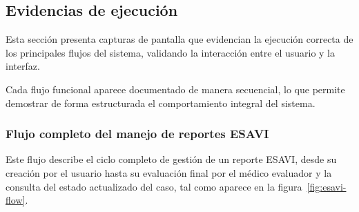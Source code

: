 \subsection{Evidencias de ejecución}

Esta sección presenta capturas de pantalla que evidencian la ejecución correcta de los principales flujos del sistema, validando la interacción entre el usuario y la interfaz.

Cada flujo funcional aparece documentado de manera secuencial, lo que permite demostrar de forma estructurada el comportamiento integral del sistema.

\subsubsection{Flujo completo del manejo de reportes ESAVI}

Este flujo describe el ciclo completo de gestión de un reporte ESAVI, desde su creación por el usuario hasta su evaluación final por el médico evaluador y la consulta del estado actualizado del caso, tal como aparece en la figura~\ref{fig:esavi-flow}.

